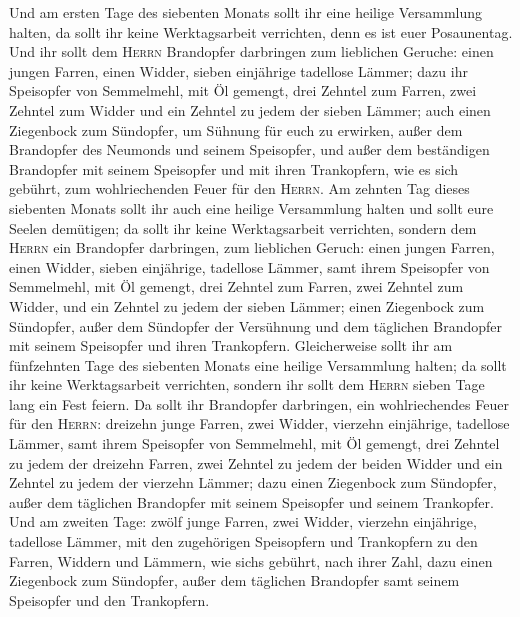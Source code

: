  Und am ersten Tage des siebenten Monats sollt ihr eine
heilige Versammlung halten, da sollt ihr keine Werktagsarbeit
verrichten, denn es ist euer Posaunentag.  Und ihr sollt
dem \textsc{Herrn} Brandopfer darbringen zum lieblichen Geruche: einen
jungen Farren, einen Widder, sieben einjährige tadellose Lämmer;
 dazu ihr Speisopfer von Semmelmehl, mit Öl gemengt, drei
Zehntel zum Farren, zwei Zehntel zum Widder  und ein
Zehntel zu jedem der sieben Lämmer;  auch einen Ziegenbock
zum Sündopfer, um Sühnung für euch zu erwirken,  außer dem
Brandopfer des Neumonds und seinem Speisopfer, und außer dem beständigen
Brandopfer mit seinem Speisopfer und mit ihren Trankopfern, wie es sich
gebührt, zum wohlriechenden Feuer für den \textsc{Herrn}. 
Am zehnten Tag dieses siebenten Monats sollt ihr auch eine heilige
Versammlung halten und sollt eure Seelen demütigen; da sollt ihr keine
Werktagsarbeit verrichten,  sondern dem \textsc{Herrn} ein
Brandopfer darbringen, zum lieblichen Geruch: einen jungen Farren, einen
Widder, sieben einjährige, tadellose Lämmer,  samt ihrem
Speisopfer von Semmelmehl, mit Öl gemengt, drei Zehntel zum Farren, zwei
Zehntel zum Widder,  und ein Zehntel zu jedem der sieben
Lämmer;  einen Ziegenbock zum Sündopfer, außer dem
Sündopfer der Versühnung und dem täglichen Brandopfer mit seinem
Speisopfer und ihren Trankopfern.  Gleicherweise sollt
ihr am fünfzehnten Tage des siebenten Monats eine heilige Versammlung
halten; da sollt ihr keine Werktagsarbeit verrichten, sondern ihr sollt
dem \textsc{Herrn} sieben Tage lang ein Fest feiern.  Da
sollt ihr Brandopfer darbringen, ein wohlriechendes Feuer für den
\textsc{Herrn}: dreizehn junge Farren, zwei Widder, vierzehn einjährige,
tadellose Lämmer,  samt ihrem Speisopfer von Semmelmehl,
mit Öl gemengt, drei Zehntel zu jedem der dreizehn Farren,
 zwei Zehntel zu jedem der beiden Widder und ein Zehntel
zu jedem der vierzehn Lämmer;  dazu einen Ziegenbock zum
Sündopfer, außer dem täglichen Brandopfer mit seinem Speisopfer und
seinem Trankopfer.  Und am zweiten Tage: zwölf junge
Farren, zwei Widder, vierzehn einjährige, tadellose Lämmer,
 mit den zugehörigen Speisopfern und Trankopfern zu den
Farren, Widdern und Lämmern, wie sich\textquotesingle s gebührt, nach
ihrer Zahl,  dazu einen Ziegenbock zum Sündopfer, außer
dem täglichen Brandopfer samt seinem Speisopfer und den Trankopfern.
